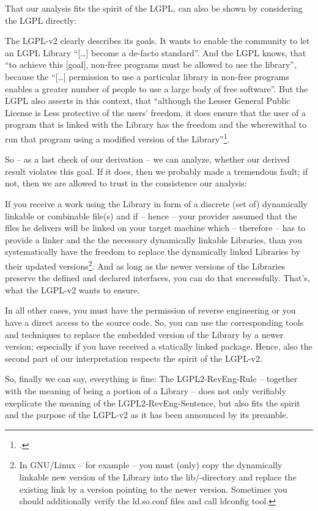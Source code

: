 That our analysis fits the spirit of the LGPL, can also be shown by considering
the LGPL directly:

The LGPL-v2 clearly describes its goals. It wants to enable the community to let
an LGPL Library \enquote{[\ldots] become a de-facto standard}. And the LGPL
knows, that \enquote{to achieve this [goal], non-free programs must be allowed
to use the library}, because the \enquote{[\ldots] permission to use a
particular library in non-free programs enables a greater number of people to
use a large body of free software}. But the LGPL also asserts in this context,
that \enquote{although the Lesser General Public License is Less protective of
the users' freedom, it does ensure that the user of a program that is linked
with the Library has the freedom and the wherewithal to run that program using a
modified version of the Library}\footcite[cf.][\nopage wp., preamble, emphasis
KR]{Lgpl21OsiLicense1999a}.

So -- as a last check of our derivation -- we can analyze, whether our derived
result violates this goal. If it does, then we probably made a tremendous fault;
if not, then we are allowed to trust in the consistence our analysis:

If you receive a work using the Library in form of a discrete (set of)
dynamically linkable or combinable file(s) and if -- hence -- your provider
assumed that the files he delivers will be linked on your target machine which
-- therefore -- has to provide a linker and the the necessary dynamically
linkable Libraries, than you systematically have the freedom to replace the
dynamically linked Libraries by their updated versions\footnote{In GNU/Linux --
for example -- you must (only) copy the dynamically linkable new version of the
Library into the lib/-directory and replace the existing link by a version
pointing to the newer version. Sometimes you should additionally verify the
ld.so.conf files and call ldconfig tool.}. And as long as the newer versions of
the Libraries preserve the defined and declared interfaces, you can do that
successfully. That's, what the LGPL-v2 wants to ensure.

In all other cases, you must have the permission of reverse engineering or you
have a direct access to the source code. So, you can use the corresponding tools
and techniques to replace the embedded version of the Library by a newer
version; especially if you have received a statically linked package. Hence,
also the second part of our interpretation respects the spirit of the LGPL-v2.

So, finally we can say, everything is fine: The LGPL2-RevEng-Rule -- together
with the meaning of being a portion of a Library -- does not only verifiably
exeplicate the meaning of the LGPL2-RevEng-Sentence, but also fits the spirit
and the purpose of the LGPL-v2 as it has been announced by its preamble.



